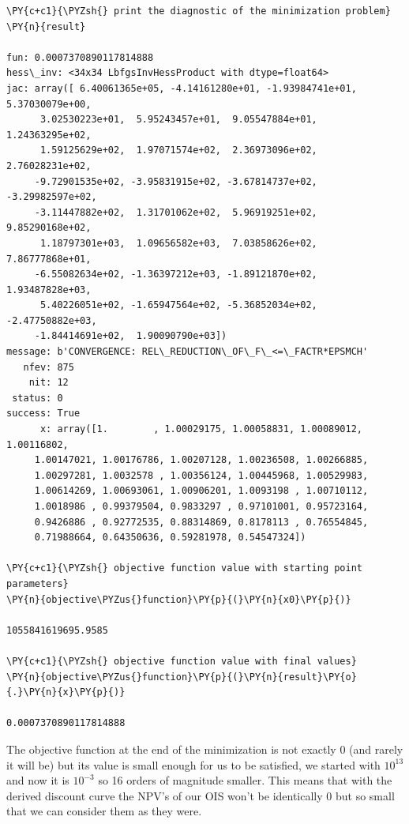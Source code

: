 \begin{Verbatim}[commandchars=\\\{\}]
\PY{c+c1}{\PYZsh{} print the diagnostic of the minimization problem}
\PY{n}{result}

fun: 0.0007370890117814888
hess\_inv: <34x34 LbfgsInvHessProduct with dtype=float64>
jac: array([ 6.40061365e+05, -4.14161280e+01, -1.93984741e+01,  5.37030079e+00,
      3.02530223e+01,  5.95243457e+01,  9.05547884e+01,  1.24363295e+02,
      1.59125629e+02,  1.97071574e+02,  2.36973096e+02,  2.76028231e+02,
     -9.72901535e+02, -3.95831915e+02, -3.67814737e+02, -3.29982597e+02,
     -3.11447882e+02,  1.31701062e+02,  5.96919251e+02,  9.85290168e+02,
      1.18797301e+03,  1.09656582e+03,  7.03858626e+02,  7.86777868e+01,
     -6.55082634e+02, -1.36397212e+03, -1.89121870e+02,  1.93487828e+03,
      5.40226051e+02, -1.65947564e+02, -5.36852034e+02, -2.47750882e+03,
     -1.84414691e+02,  1.90090790e+03])
message: b'CONVERGENCE: REL\_REDUCTION\_OF\_F\_<=\_FACTR*EPSMCH'
   nfev: 875
    nit: 12
 status: 0
success: True
      x: array([1.        , 1.00029175, 1.00058831, 1.00089012, 1.00116802,
     1.00147021, 1.00176786, 1.00207128, 1.00236508, 1.00266885,
     1.00297281, 1.0032578 , 1.00356124, 1.00445968, 1.00529983,
     1.00614269, 1.00693061, 1.00906201, 1.0093198 , 1.00710112,
     1.0018986 , 0.99379504, 0.9833297 , 0.97101001, 0.95723164,
     0.9426886 , 0.92772535, 0.88314869, 0.8178113 , 0.76554845,
     0.71988664, 0.64350636, 0.59281978, 0.54547324])

\PY{c+c1}{\PYZsh{} objective function value with starting point parameters}
\PY{n}{objective\PYZus{}function}\PY{p}{(}\PY{n}{x0}\PY{p}{)} 

1055841619695.9585

\PY{c+c1}{\PYZsh{} objective function value with final values}
\PY{n}{objective\PYZus{}function}\PY{p}{(}\PY{n}{result}\PY{o}{.}\PY{n}{x}\PY{p}{)} 

0.0007370890117814888
\end{Verbatim}

The objective function at the end of the minimization is not exactly 0 (and rarely it will be) but its value is small enough for us to be satisfied, we started with $10^{13}$ and now it is $10^{-3}$ so 16 orders of magnitude smaller. This means that with the derived discount curve the NPV's of our OIS won't be identically 0 but so small that we can consider them as they were.

